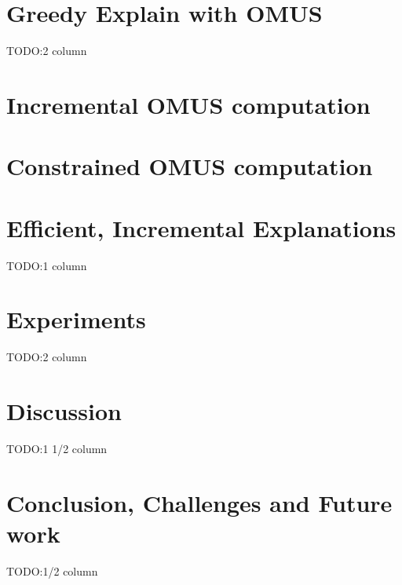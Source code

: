 \documentclass[letterpaper]{article} %
\newcommand\comment[1]{\marginpar{\tiny #1}}
\renewcommand\comment[1]{#1}
\newcommand{\todo}[1]{{\comment{\color{red}\textsc{TODO:}#1} }}
\begin{document}
\section{Greedy Explain with OMUS}\label{sec:Greedy}
\todo{2 column}



\section{Incremental OMUS computation} \label{sec:incremental}

\section{Constrained OMUS computation} \label{sec:constrained}


\section{Efficient, Incremental Explanations}\label{sec:explanations}\label{sec:incrementalExp}
\todo{1 column}

\section{Experiments}
\todo{2 column}

\section{Discussion}
\todo{1 1/2 column}

\section{Conclusion, Challenges and Future work}
\todo{1/2 column}



\end{document}
